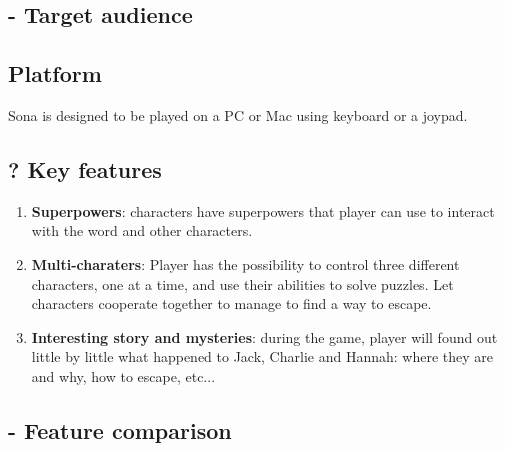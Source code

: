 \subsection{- Target audience}

\subsection{Platform}
Sona is designed to be played on a PC or Mac using keyboard or a joypad.

\subsection{? Key features}
\begin{enumerate}
	\item \textbf{Superpowers}: characters have superpowers that player can use to interact with the word and other characters.
	\item \textbf{Multi-charaters}: Player has the possibility to control three different characters, one at a time, and use their abilities to solve puzzles. Let characters cooperate together to manage to find a way to escape.
	\item \textbf{Interesting story and mysteries}: during the game, player will found out little by little what happened to Jack, Charlie and Hannah: where they are and why, how to escape, etc...
\end{enumerate}

\subsection{- Feature comparison}
